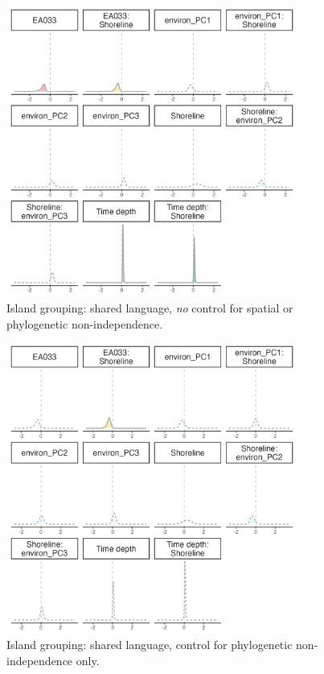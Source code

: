 \documentclass[unnumsec,webpdf,modern,medium]{oup-authoring-template}
\begin{document}


\begin{figure}[ht]
\includegraphics[width=0.85\textwidth]{brms_medium_control_none_group_full_effect_ridge_panels_plot.png}
\caption{Island grouping: shared language, \emph{no} control for spatial or phylogenetic non-independence.}
\label{brms_medium_control_none_group_full_effect_ridge_panels_plot}
\end{figure}

\begin{figure}[ht]
\includegraphics[width=0.85\textwidth]{brms_medium_control_phylo_group_full_effect_ridge_panels_plot.png}
\caption{Island grouping: shared language, control for phylogenetic non-independence only.}
\label{brms_medium_group_full_effect_ridge_panels_phylo}
\end{figure}
\end{document}
